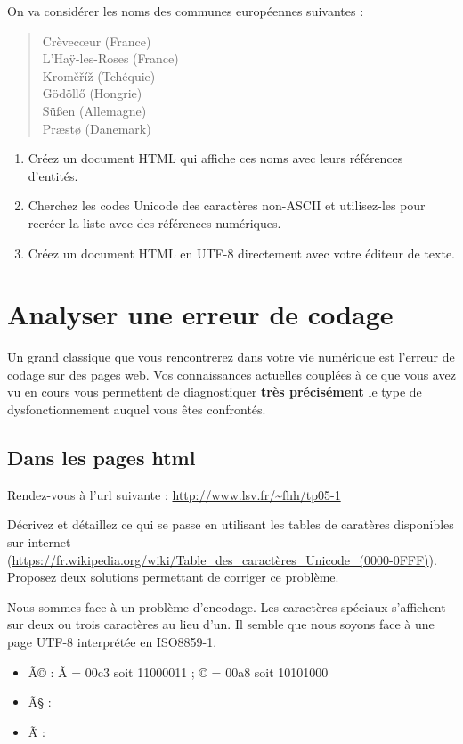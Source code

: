 \documentclass[11pt]{article}
\begin{document}
On va considérer les noms des communes européennes suivantes :
 \begin{quote}
 Crèvec\oe{}ur (France)\\ L'Ha\"y-les-Roses (France)\\ Krom\v{e}\v{r}\'i\v{z}
(Tchéquie)\\ G\"od\"oll\H{o} (Hongrie)\\ S\"u\ss{}en (Allemagne)\\
Pr\ae{}st\o{} (Danemark)
 \end{quote}

\begin{enumerate}
 \item Créez un document HTML qui affiche ces noms avec leurs
références d'entités.\smallskip
 \item Cherchez les codes Unicode des caractères
non-ASCII et utilisez-les pour recréer la liste avec des références
numériques.\smallskip
 \item Créez un document HTML en UTF-8 directement avec
votre éditeur de texte.
\end{enumerate}



\section{Analyser une erreur de codage}

Un grand classique que vous rencontrerez dans votre vie numérique est l'erreur
de codage sur des pages web. Vos connaissances actuelles couplées à ce que vous
avez vu en cours vous permettent de diagnostiquer \textbf{très précisément} le
type de dysfonctionnement auquel vous êtes confrontés.\bigskip

\subsection{Dans les pages html}

Rendez-vous à l'url suivante : \url{http://www.lsv.fr/~fhh/tp05-1}\bigskip

Décrivez et détaillez ce qui se passe en utilisant les tables de caratères
disponibles sur internet
(\url{https://fr.wikipedia.org/wiki/Table_des_caractères_Unicode_(0000-0FFF)}).
Proposez deux solutions permettant de corriger ce problème.

\begin{solution}

Nous sommes face à un problème d'encodage. Les caractères spéciaux s'affichent
sur deux ou trois caractères au lieu d'un. Il semble que nous soyons face à une
page UTF-8 interprétée en ISO8859-1.

\begin{itemize}
 \item Ã© : Ã = 00c3 soit 11000011 ; © = 00a8 soit 10101000
 \item Ã§ :
 \item Ã\"{ } : 
\end{itemize}

\end{solution}
\end{document}
